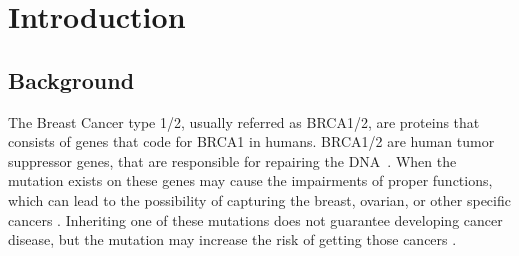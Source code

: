 \chapter{Introduction}
\section{Background}
The Breast Cancer type 1/2, usually referred as BRCA1/2, are proteins that consists of genes that code for BRCA1 in humans. BRCA1/2 are human tumor suppressor genes, that are responsible for repairing the DNA~\cite{duncan1998brca1}. 
When the mutation exists on these genes may cause the impairments of proper functions, which can lead to the possibility of capturing the breast, ovarian, or other specific cancers \cite{greer2006role, haffty2002outcome, huang2018association}. 
Inheriting one of these mutations does not guarantee developing cancer disease, but the mutation may increase the risk of getting those cancers \cite{friedenson2007brca1}. 
